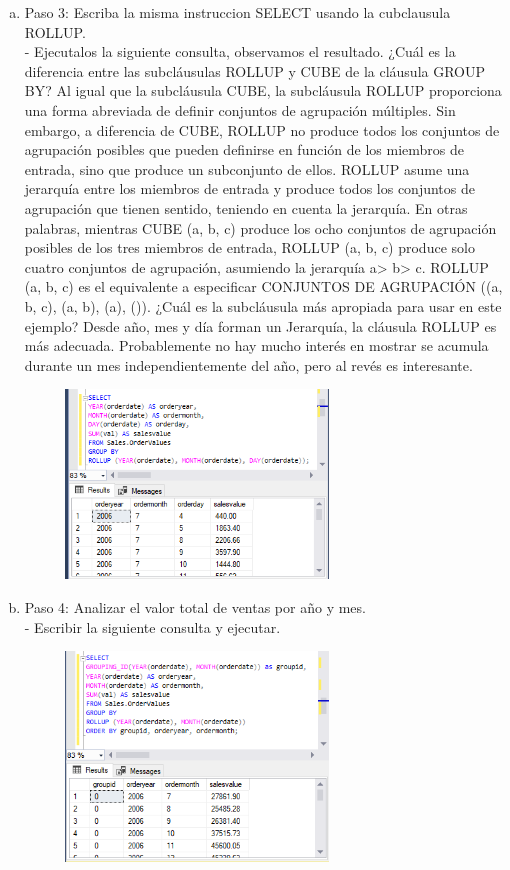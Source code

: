 \begin{enumerate}[1.]
\begin{enumerate}[a)]
\begin{figure}[H]
\begin{center}
		\end{center}
		\end{figure}
	\item Paso 3: Escriba la misma instruccion SELECT usando la cubclausula ROLLUP.\\
		-  Ejecutalos la siguiente consulta, observamos el resultado. ¿Cuál es la diferencia entre las subcláusulas ROLLUP y CUBE de la cláusula GROUP BY? Al igual que la subcláusula CUBE, la subcláusula ROLLUP proporciona una forma abreviada de definir conjuntos de agrupación múltiples. Sin embargo, a diferencia de CUBE, ROLLUP no produce todos los conjuntos de agrupación posibles que pueden definirse en función de los miembros de entrada, sino que produce un subconjunto de ellos. ROLLUP asume una jerarquía entre los miembros de entrada y produce todos los conjuntos de agrupación que tienen sentido, teniendo en cuenta la jerarquía. En otras palabras, mientras CUBE (a, b, c) produce los ocho conjuntos de agrupación posibles de los tres miembros de entrada, ROLLUP (a, b, c) produce solo cuatro conjuntos de agrupación, asumiendo la jerarquía a> b> c. ROLLUP (a, b, c) es el equivalente a especificar CONJUNTOS DE AGRUPACIÓN ((a, b, c), (a, b), (a), ()).
¿Cuál es la subcláusula más apropiada para usar en este ejemplo? Desde año, mes y día forman un
Jerarquía, la cláusula ROLLUP es más adecuada. Probablemente no hay mucho interés en mostrar
se acumula durante un mes independientemente del año, pero al revés es interesante.
		\begin{figure}[H]
		\begin{center}
		\includegraphics[width=7cm]{./Imagenes/e3-3}
		\end{center}
		\end{figure}
	\item Paso 4: Analizar el valor total de ventas por año y mes.\\
		-  Escribir la siguiente consulta y ejecutar. 
		\begin{figure}[H]
		\begin{center}
		\includegraphics[width=7cm]{./Imagenes/e3-4}

\end{center}
\end{figure}
\end{enumerate}
\end{enumerate}
